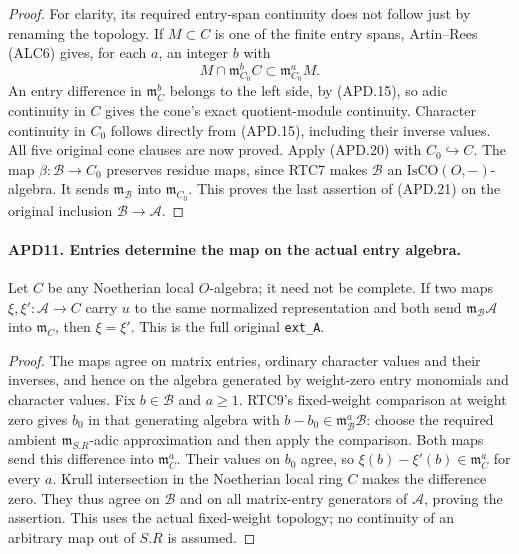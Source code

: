\begin{proof}
For clarity, its required entry-span continuity does not follow
just by renaming the topology.  If
\(M\subset C\) is one of the finite entry spans, Artin--Rees
(ALC6) gives, for each \(a\), an integer \(b\) with
\[
 M\cap\mathfrak m_{C_0}^{b}C
                         \subset\mathfrak m_{C_0}^{a}M.
                                                               \tag{APD.22}
\]
An entry difference in \(\mathfrak m_C^b\) belongs to the
left side, by (APD.15), so adic continuity in \(C\) gives the
cone's exact quotient-module continuity.  Character continuity
in \(C_0\) follows directly from (APD.15), including their
inverse values.  All five original cone clauses are now proved.
Apply (APD.20) with \(C_0\hookrightarrow C\).
The map \(\beta:\mathcal B\to C_0\) preserves residue
maps, since RTC7 makes \(\mathcal B\) an
\(\mathrm{IsCO}(O,-)\)-algebra.  It sends
\(\mathfrak m_{\mathcal B}\) into \(\mathfrak m_{C_0}\).
This proves the last assertion of (APD.21) on the original
inclusion \(\mathcal B\to\mathcal A\).
\end{proof}

\paragraph{APD11. Entries determine the map on the actual entry algebra.}
\label{claim:APD11}
Let \(C\) be any Noetherian local \(O\)-algebra; it need not
be complete.  If two maps \(\xi,\xi':\mathcal A\to C\)
carry \(u\) to the same normalized representation and both send
\(\mathfrak m_{\mathcal B}\mathcal A\) into \(\mathfrak m_C\),
then \(\xi=\xi'\).  This is the full original \texttt{ext\_A}.

\begin{proof}
The maps agree on matrix entries, ordinary character values and
their inverses, and hence on the algebra generated by weight-zero
entry monomials and character values.  Fix \(b\in\mathcal B\)
and \(a\ge1\).  RTC9's fixed-weight comparison at weight zero
gives \(b_0\) in that generating algebra with
\(b-b_0\in\mathfrak m_{\mathcal B}^{a}\mathcal B\): choose
the required ambient \(\mathfrak m_{S.R}\)-adic approximation
and then apply the comparison.  Both maps send this difference
into \(\mathfrak m_C^a\).  Their values on \(b_0\) agree,
so \(\xi(b)-\xi'(b)\in\mathfrak m_C^a\) for every \(a\).
Krull intersection in the Noetherian local ring \(C\) makes
the difference zero.  They thus agree on \(\mathcal B\) and
on all matrix-entry generators of \(\mathcal A\), proving
the assertion.  This uses the actual fixed-weight topology; no
continuity of an arbitrary map out of \(S.R\) is assumed.
\end{proof}

